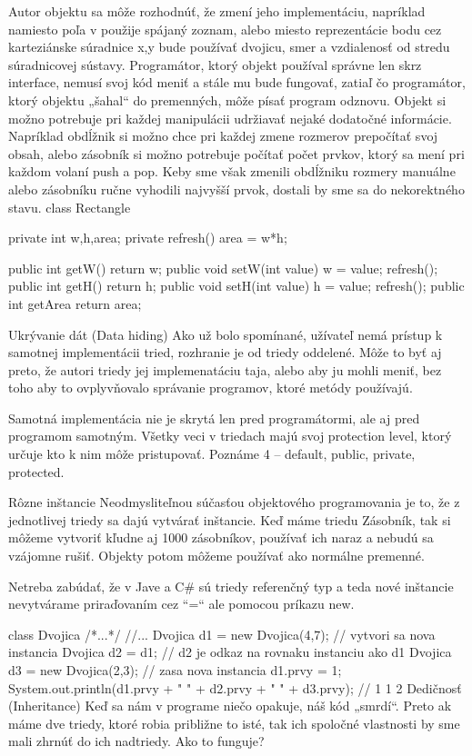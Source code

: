 Autor objektu sa môže rozhodnúť, že zmení jeho implementáciu, napríklad namiesto poľa v použije spájaný zoznam, alebo miesto reprezentácie bodu cez karteziánske súradnice x,y bude používať dvojicu, smer a vzdialenosť od stredu súradnicovej sústavy. Programátor, ktorý objekt používal správne len skrz interface, nemusí svoj kód meniť a stále mu bude fungovať, zatiaľ čo programátor, ktorý objektu „šahal“ do premenných, môže písať program odznovu.
Objekt si možno potrebuje pri každej manipulácii udržiavať nejaké dodatočné informácie. Napríklad obdĺžnik si možno chce pri každej zmene rozmerov prepočítať svoj obsah, alebo zásobník si možno potrebuje počítať počet prvkov, ktorý sa mení pri každom volaní push a pop. Keby sme však zmenili obdĺžniku rozmery manuálne alebo zásobníku ručne vyhodili najvyšší prvok, dostali by sme sa do nekorektného stavu.
class Rectangle {
    private int w,h,area;
    private refresh(){ 
        area = w*h;
    }
 
    public int getW(){ return w; }
    public void setW(int value) {
        w = value;
        refresh();
    }
    public int getH(){ return h; }
    public void setH(int value) {
        h = value;
        refresh();
    }
    public int getArea{ return area; }
 
}
Ukrývanie dát (Data hiding)
Ako už bolo spomínané, užívateľ nemá prístup k samotnej implementácii tried, rozhranie je od triedy oddelené. Môže to byť aj preto, že autori triedy jej implemenatáciu taja, alebo aby ju mohli meniť, bez toho aby to ovplyvňovalo správanie programov, ktoré metódy používajú.

Samotná implementácia nie je skrytá len pred programátormi, ale aj pred programom samotným. Všetky veci v triedach majú svoj protection level, ktorý určuje kto k nim môže pristupovať. Poznáme 4 – default, public, private, protected.

Rôzne inštancie
Neodmysliteľnou súčasťou objektového programovania je to, že z jednotlivej triedy sa dajú vytvárať inštancie. Keď máme triedu Zásobník, tak si môžeme vytvoriť kľudne aj 1000 zásobníkov, používať ich naraz a nebudú sa vzájomne rušiť. Objekty potom môžeme používať ako normálne premenné.

Netreba zabúdať, že v Jave a C\# sú triedy referenčný typ a teda nové inštancie nevytvárame priraďovaním cez “=“ ale pomocou príkazu new.

class Dvojica { /*...*/ }
//...
{
    Dvojica d1 = new Dvojica(4,7);  // vytvori sa nova instancia
    Dvojica d2 = d1;                // d2 je odkaz na rovnaku instanciu ako d1
    Dvojica d3 = new Dvojica(2,3);  // zasa nova instancia
    d1.prvy = 1;
    System.out.println(d1.prvy + " " + d2.prvy + " " + d3.prvy);
    // 1 1 2
}
Dedičnosť (Inheritance)
Keď sa nám v programe niečo opakuje, náš kód „smrdí“. Preto ak máme dve triedy, ktoré robia približne to isté, tak ich spoločné vlastnosti by sme mali zhrnúť do ich nadtriedy. Ako to funguje?

